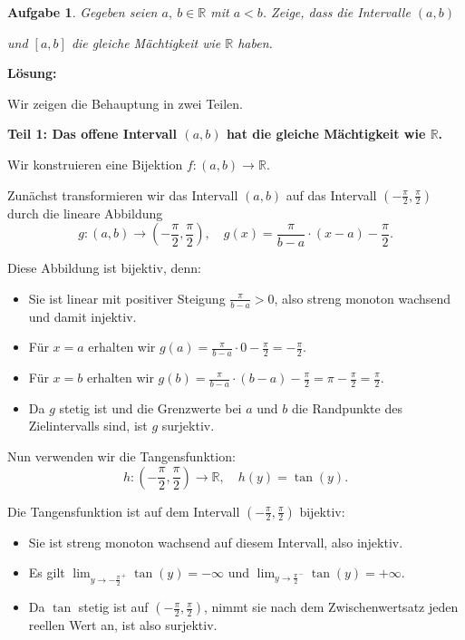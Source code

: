 \documentclass[11pt,a4paper]{article}
\newtheorem{prob}{Aufgabe}
\newcommand{\R}{\mathbb{R}}
\begin{document}
\begin{prob}

  Gegeben seien $a,\ b \in \R$ mit $a < b$. Zeige, dass die Intervalle $(a,b)$

  und $[a,b]$ die gleiche Mächtigkeit wie $\R$ haben.

\end{prob}

\textbf{Lösung:}

Wir zeigen die Behauptung in zwei Teilen.

\textbf{Teil 1: Das offene Intervall $(a,b)$ hat die gleiche Mächtigkeit wie $\R$.}

Wir konstruieren eine Bijektion $f: (a,b) \to \R$.

Zunächst transformieren wir das Intervall $(a,b)$ auf das Intervall $(-\frac{\pi}{2}, \frac{\pi}{2})$ durch die lineare Abbildung
$$g: (a,b) \to \left(-\frac{\pi}{2}, \frac{\pi}{2}\right), \quad g(x) = \frac{\pi}{b-a} \cdot (x - a) - \frac{\pi}{2}.$$

Diese Abbildung ist bijektiv, denn:
\begin{itemize}
\item Sie ist linear mit positiver Steigung $\frac{\pi}{b-a} > 0$, also streng monoton wachsend und damit injektiv.
\item Für $x = a$ erhalten wir $g(a) = \frac{\pi}{b-a} \cdot 0 - \frac{\pi}{2} = -\frac{\pi}{2}$.
\item Für $x = b$ erhalten wir $g(b) = \frac{\pi}{b-a} \cdot (b-a) - \frac{\pi}{2} = \pi - \frac{\pi}{2} = \frac{\pi}{2}$.
\item Da $g$ stetig ist und die Grenzwerte bei $a$ und $b$ die Randpunkte des Zielintervalls sind, ist $g$ surjektiv.
\end{itemize}

Nun verwenden wir die Tangensfunktion:
$$h: \left(-\frac{\pi}{2}, \frac{\pi}{2}\right) \to \R, \quad h(y) = \tan(y).$$

Die Tangensfunktion ist auf dem Intervall $(-\frac{\pi}{2}, \frac{\pi}{2})$ bijektiv:
\begin{itemize}
\item Sie ist streng monoton wachsend auf diesem Intervall, also injektiv.
\item Es gilt $\lim_{y \to -\frac{\pi}{2}^+} \tan(y) = -\infty$ und $\lim_{y \to \frac{\pi}{2}^-} \tan(y) = +\infty$.
\item Da $\tan$ stetig ist auf $(-\frac{\pi}{2}, \frac{\pi}{2})$, nimmt sie nach dem Zwischenwertsatz jeden reellen Wert an, ist also surjektiv.
\end{itemize}
\end{document}
